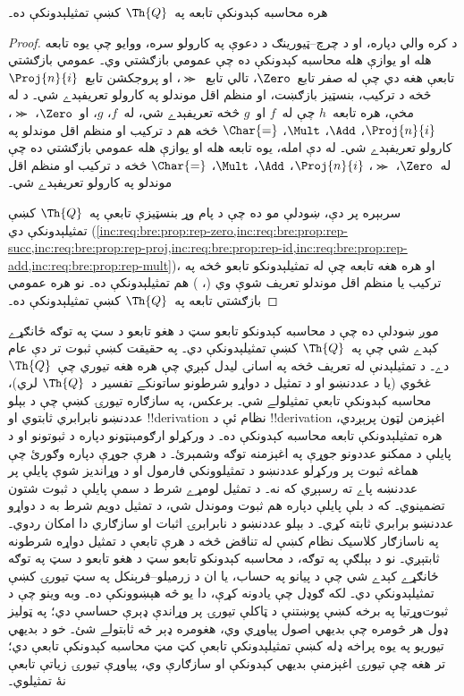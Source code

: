 \documentclass[../../../include/open-logic-section]{subfiles}
\begin{document}

\begin{thm}
هره محاسبه کېدونکې تابعه په~$\Th{Q}$ کښې تمثيلېدونکې ده۔
\end{thm}

\begin{proof}
د کره والي دپاره، او د چرچ--ټيورينګ د دعوې په کارولو سره، ووايو چې
يوه تابعه هله او يوازې هله محاسبه کېدونکې ده چې عمومي بازګشتي وي۔
عمومي بازګشتي تابعې هغه دي چې له صفر تابع~$\Zero$، تالي
تابع~$\Succ$، او پروجکشن تابع~$\Proj{n}{i}$ څخه د ترکيب، بنسټيز
بازګښت، او منظم اقل موندلو په کارولو تعريفېدے شي۔ د
 له مخې، هره تابعه~$h$ چې له~$f$ او~$g$
څخه تعريفېدے شي، له~$f$، $g$، او~$\Zero$، $\Succ$،
$\Proj{n}{i}$، $\Add$، $\Mult$، $\Char{=}$ څخه هم د ترکيب او منظم
اقل موندلو په کارولو تعريفېدے شي۔ له دې امله، يوه تابعه هله او يوازې
هله عمومي بازګشتي ده چې له~$\Zero$، $\Succ$، $\Proj{n}{i}$،
$\Add$، $\Mult$، $\Char{=}$ څخه د ترکيب او منظم اقل موندلو په
کارولو تعريفېدے شي۔

سربېره پر دې، ښودلې مو ده چې د پام وړ بنسټيزې تابعې په~$\Th{Q}$
کښې تمثيلېدونکې دي
(\cref{inc:req:bre:prop:rep-zero,inc:req:bre:prop:rep-succ,inc:req:bre:prop:rep-proj,inc:req:bre:prop:rep-id,inc:req:bre:prop:rep-add,inc:req:bre:prop:rep-mult})،
او هره هغه تابعه چې له تمثيلېدونکو تابعو څخه په ترکيب يا منظم اقل
موندلو تعريف شوې وي
(،
) هم تمثيلېدونکې ده۔ نو هره عمومي
بازګشتي تابعه په~$\Th{Q}$ کښې تمثيلېدونکې ده۔
\end{proof}

\begin{explain}
موږ ښودلې ده چې د محاسبه کېدونکو تابعو سټ د هغو تابعو د سټ په توګه
ځانګړے کېدے شي چې په~$\Th{Q}$ کښې تمثيلېدونکې دي۔ په حقيقت کښې
ثبوت تر دې عام دے۔ د تمثيلېدنې له تعريف څخه په اسانۍ ليدل کېږي چې
هره هغه تيوري چې~$\Th{Q}$ غځوي (يا د عددنښو او د تمثيل د دواړو شرطونو ساتونکے تفسير د~$\Th{Q}$ لري)،
محاسبه کېدونکې تابعې تمثيلولے شي۔ برعکس، په سازګاره تيورۍ کښې چې د بېلو عددنښو نابرابري ثابتوي او !!{derivation} نظام ئې د !!{derivation} اغېزمن لټون پرېږدي، هره تمثيلېدونکې تابعه محاسبه کېدونکې ده۔ د ورکړلو ارګومېنټونو دپاره د ثبوتونو او د پايلې د ممکنو عددونو جوړې په اغېزمنه توګه وشمېرئ۔ د هرې جوړې دپاره وګورئ چې هماغه ثبوت پر ورکړلو عددنښو د تمثيلوونکي فارمول او د وړانديز شوې پايلې پر عددنښه پاے ته رسېږي که نه۔ د تمثيل لومړے شرط د سمې پايلې د ثبوت شتون تضمينوي۔ که د بلې پايلې دپاره هم ثبوت وموندل شي، د تمثيل دويم شرط به د دواړو عددنښو برابري ثابته کړي۔ د بېلو عددنښو د نابرابرۍ اثبات او سازګاري دا امکان ردوي۔ په ناسازګار کلاسيک نظام کښې له تناقض څخه د هرې تابعې د تمثيل دواړه شرطونه ثابتېږي۔ نو د بېلګې په توګه، د
محاسبه کېدونکو تابعو سټ د هغو تابعو د سټ په توګه ځانګړے کېدے شي چې
د پيانو په حساب، يا ان د زرمیلو--فرېنکل په سټ تيورۍ کښې تمثيلېدونکې
دي۔ لکه ګوډل چې يادونه کړې، دا يو څه هېښوونکې ده۔ وبه وينو چې د
ثبوت‌وړتيا په برخه کښې پوښتنې د ټاکلې تيورۍ پر وړاندې ډېرې حساسې
دي؛ په ټوليز ډول هر څومره چې بديهي اصول پياوړي وي، هغومره ډېر څه
ثابتولے شئ۔ خو د بديهي تيوريو په يوه پراخه ډله کښې تمثيلېدونکې
تابعې کټ مټ محاسبه کېدونکې تابعې دي؛ تر هغه چې تيورۍ
اغېزمنې بديهي کېدونکې او سازګارې وي، پياوړې تيورۍ زياتې تابعې نۀ تمثيلوي۔
\end{explain}
\end{document}
